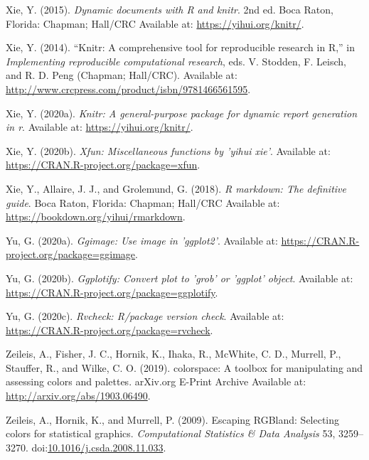 \documentclass[utf8]{frontiersSCNS}
\begin{document}
\leavevmode\hypertarget{ref-xie2015dynamic}{}%
Xie, Y. (2015). \emph{Dynamic documents with R and knitr}. 2nd ed. Boca
Raton, Florida: Chapman; Hall/CRC Available at:
\url{https://yihui.org/knitr/}.

\leavevmode\hypertarget{ref-xie2014knitr}{}%
Xie, Y. (2014). ``Knitr: A comprehensive tool for reproducible research
in R,'' in \emph{Implementing reproducible computational research}, eds.
V. Stodden, F. Leisch, and R. D. Peng (Chapman; Hall/CRC). Available at:
\url{http://www.crcpress.com/product/isbn/9781466561595}.

\leavevmode\hypertarget{ref-xie2020knitr}{}%
Xie, Y. (2020a). \emph{Knitr: A general-purpose package for dynamic
report generation in r}. Available at: \url{https://yihui.org/knitr/}.

\leavevmode\hypertarget{ref-xie2020xfun}{}%
Xie, Y. (2020b). \emph{Xfun: Miscellaneous functions by 'yihui xie'}.
Available at: \url{https://CRAN.R-project.org/package=xfun}.

\leavevmode\hypertarget{ref-xie2018markdown}{}%
Xie, Y., Allaire, J. J., and Grolemund, G. (2018). \emph{R markdown: The
definitive guide}. Boca Raton, Florida: Chapman; Hall/CRC Available at:
\url{https://bookdown.org/yihui/rmarkdown}.

\leavevmode\hypertarget{ref-yu2020ggimage}{}%
Yu, G. (2020a). \emph{Ggimage: Use image in 'ggplot2'}. Available at:
\url{https://CRAN.R-project.org/package=ggimage}.

\leavevmode\hypertarget{ref-yu2020ggplotify}{}%
Yu, G. (2020b). \emph{Ggplotify: Convert plot to 'grob' or 'ggplot'
object}. Available at:
\url{https://CRAN.R-project.org/package=ggplotify}.

\leavevmode\hypertarget{ref-yu2020rvcheck}{}%
Yu, G. (2020c). \emph{Rvcheck: R/package version check}. Available at:
\url{https://CRAN.R-project.org/package=rvcheck}.

\leavevmode\hypertarget{ref-zeileis2019colorspace}{}%
Zeileis, A., Fisher, J. C., Hornik, K., Ihaka, R., McWhite, C. D.,
Murrell, P., Stauffer, R., and Wilke, C. O. (2019). colorspace: A
toolbox for manipulating and assessing colors and palettes. arXiv.org
E-Print Archive Available at: \url{http://arxiv.org/abs/1903.06490}.

\leavevmode\hypertarget{ref-zeileis2009escaping}{}%
Zeileis, A., Hornik, K., and Murrell, P. (2009). Escaping RGBland:
Selecting colors for statistical graphics. \emph{Computational
Statistics \& Data Analysis} 53, 3259--3270.
doi:\href{https://doi.org/10.1016/j.csda.2008.11.033}{10.1016/j.csda.2008.11.033}.
\end{document}

